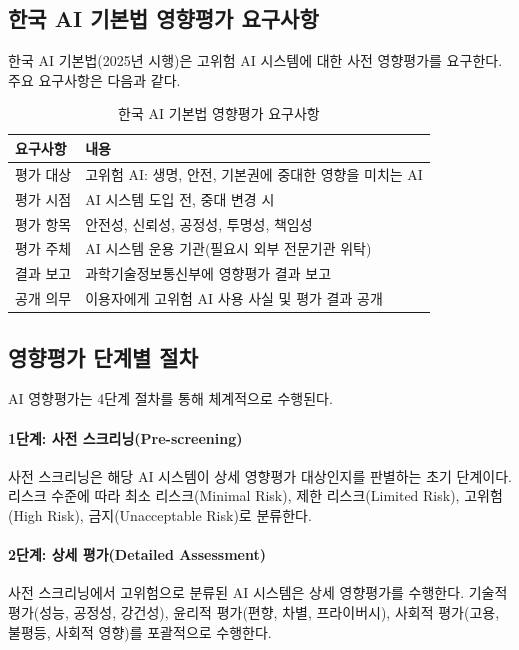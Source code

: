 \subsection{한국 AI 기본법 영향평가 요구사항}
\label{sec:5.2.2}

한국 AI 기본법(2025년 시행)은 고위험 AI 시스템에 대한 사전 영향평가를 요구한다. 주요 요구사항은 다음과 같다.

\begin{table}[htbp]
\centering
\caption{한국 AI 기본법 영향평가 요구사항}
\label{tab:korea_ai_act_ia}
\begin{tabularx}{\textwidth}{p{3cm}X}
\toprule
\textbf{요구사항} & \textbf{내용} \\
\midrule
평가 대상 & 고위험 AI: 생명, 안전, 기본권에 중대한 영향을 미치는 AI \\
평가 시점 & AI 시스템 도입 전, 중대 변경 시 \\
평가 항목 & 안전성, 신뢰성, 공정성, 투명성, 책임성 \\
평가 주체 & AI 시스템 운용 기관(필요시 외부 전문기관 위탁) \\
결과 보고 & 과학기술정보통신부에 영향평가 결과 보고 \\
공개 의무 & 이용자에게 고위험 AI 사용 사실 및 평가 결과 공개 \\
\bottomrule
\end{tabularx}
\end{table}

\subsection{영향평가 단계별 절차}
\label{sec:5.2.3}

AI 영향평가는 4단계 절차를 통해 체계적으로 수행된다.

\paragraph{1단계: 사전 스크리닝(Pre-screening)}
사전 스크리닝은 해당 AI 시스템이 상세 영향평가 대상인지를 판별하는 초기 단계이다. 리스크 수준에 따라 최소 리스크(Minimal Risk), 제한 리스크(Limited Risk), 고위험(High Risk), 금지(Unacceptable Risk)로 분류한다.

\paragraph{2단계: 상세 평가(Detailed Assessment)}
사전 스크리닝에서 고위험으로 분류된 AI 시스템은 상세 영향평가를 수행한다. 기술적 평가(성능, 공정성, 강건성), 윤리적 평가(편향, 차별, 프라이버시), 사회적 평가(고용, 불평등, 사회적 영향)를 포괄적으로 수행한다.


